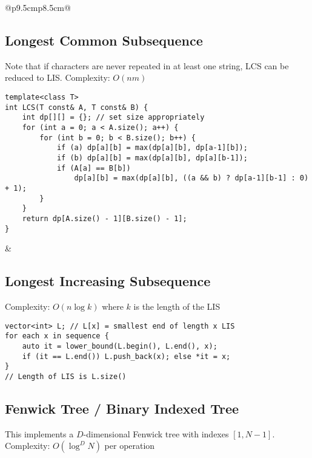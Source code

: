 \documentclass[letterpaper]{article}
\begin{document}
\begin{tabular}{@{}p{9.5cm}p{8.5cm}@{}}
\subsection{Longest Common Subsequence}
Note that if characters are never repeated in at least one string, LCS can be reduced to LIS. Complexity: $O\left(nm\right)$

\begin{lstlisting}
template<class T>
int LCS(T const& A, T const& B) {
	int dp[][] = {}; // set size appropriately
	for (int a = 0; a < A.size(); a++) {
		for (int b = 0; b < B.size(); b++) {
			if (a) dp[a][b] = max(dp[a][b], dp[a-1][b]);
			if (b) dp[a][b] = max(dp[a][b], dp[a][b-1]);
			if (A[a] == B[b])
				dp[a][b] = max(dp[a][b], ((a && b) ? dp[a-1][b-1] : 0) + 1);
		}
	}
	return dp[A.size() - 1][B.size() - 1];
}
\end{lstlisting}
&
\subsection{Longest Increasing Subsequence}
Complexity: $O\left(n\log k\right)$ where $k$ is the length of the LIS

\begin{lstlisting}
vector<int> L; // L[x] = smallest end of length x LIS
for each x in sequence {
	auto it = lower_bound(L.begin(), L.end(), x);
	if (it == L.end()) L.push_back(x); else *it = x;
}
// Length of LIS is L.size()
\end{lstlisting}
\end{tabular}

\clearpage

\subsection{Fenwick Tree / Binary Indexed Tree}

This implements a $D$-dimensional Fenwick tree with indexes $\left[1,N-1\right]$. Complexity: $O\left(\log^DN\right)$ per operation
\end{document}

